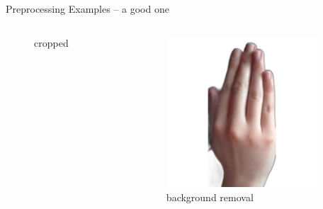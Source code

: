 \documentclass[aspectratio=169]{beamer}
\begin{document}
{\begin{frame}{Preprocessing Examples -- a good one}
\begin{columns}[c]
\begin{column}{.33\textwidth}
\begin{figure}
        \caption{cropped}
    \end{figure}
    \end{column}
    
    \begin{column}{.33\textwidth}
    \begin{figure}
        \centering
        \includegraphics[width=0.9\textwidth]{img/rembg/nasmi_203.png}
        \caption{background removal}
    \end{figure}
    \end{column}
\end{columns}
\end{frame}

}
\end{document}
